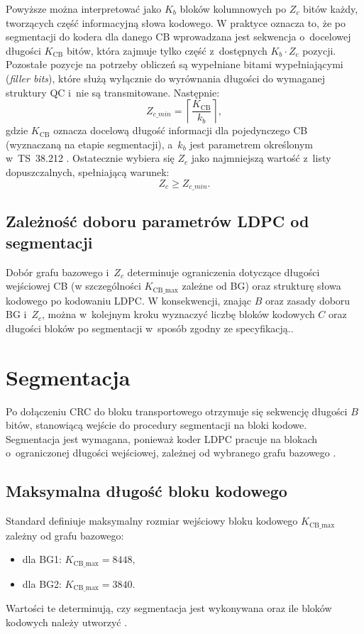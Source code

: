 Powyższe można interpretować jako $K_b$ bloków kolumnowych po $Z_c$ bitów każdy, tworzących część informacyjną słowa kodowego. W praktyce oznacza to, że po segmentacji do kodera dla danego CB wprowadzana jest sekwencja o~docelowej długości $K_{\mathrm{CB}}$ bitów, która zajmuje tylko część z~dostępnych $K_b \cdot Z_c$ pozycji. Pozostałe pozycje na potrzeby obliczeń są wypełniane bitami wypełniającymi (\emph{filler bits}), które służą wyłącznie do wyrównania długości do wymaganej struktury QC i~nie są transmitowane. Następnie:
\begin{equation}
  Z_{c\_min} = \left\lceil \frac{K_{\mathrm{CB}}}{k_b} \right\rceil,
  \label{eq:zc_min}
\end{equation}
gdzie $K_{\mathrm{CB}}$ oznacza docelową długość informacji dla pojedynczego CB (wyznaczaną na etapie segmentacji), a~$k_b$ jest parametrem określonym w~TS~38.212 \cite{bib:3gpp_38212}. Ostatecznie wybiera się $Z_c$ jako najmniejszą wartość z~listy dopuszczalnych, spełniającą warunek:
\begin{equation}
  Z_c \ge Z_{c\_min}.
  \label{eq:zc_choice}
\end{equation}

\subsection{Zależność doboru parametrów LDPC od segmentacji}
Dobór grafu bazowego i~$Z_c$ determinuje ograniczenia dotyczące długości wejściowej CB (w szczególności $K_{\mathrm{CB\_max}}$ zależne od BG) oraz strukturę słowa kodowego po kodowaniu LDPC. W konsekwencji, znając $B$ oraz zasady doboru BG i~$Z_c$, można w~kolejnym kroku wyznaczyć liczbę bloków kodowych $C$ oraz długości bloków po segmentacji w~sposób zgodny ze specyfikacją.\cite{bib:3gpp_38212}.





\section{Segmentacja}
\label{sec:analiza_segmentacja}

Po dołączeniu CRC do bloku transportowego otrzymuje się sekwencję długości $B$ bitów, stanowiącą wejście do procedury segmentacji na bloki kodowe. Segmentacja jest wymagana, ponieważ koder LDPC pracuje na blokach o~ograniczonej długości wejściowej, zależnej od wybranego grafu bazowego \cite{bib:3gpp_38212}.

\subsection{Maksymalna długość bloku kodowego}
Standard definiuje maksymalny rozmiar wejściowy bloku kodowego $K_{\mathrm{CB\_max}}$ zależny od grafu bazowego:
\begin{itemize}
  \item dla BG1: $K_{\mathrm{CB\_max}} = 8448$,
  \item dla BG2: $K_{\mathrm{CB\_max}} = 3840$.
\end{itemize}
Wartości te determinują, czy segmentacja jest wykonywana oraz ile bloków kodowych należy utworzyć \cite{bib:3gpp_38212}.

